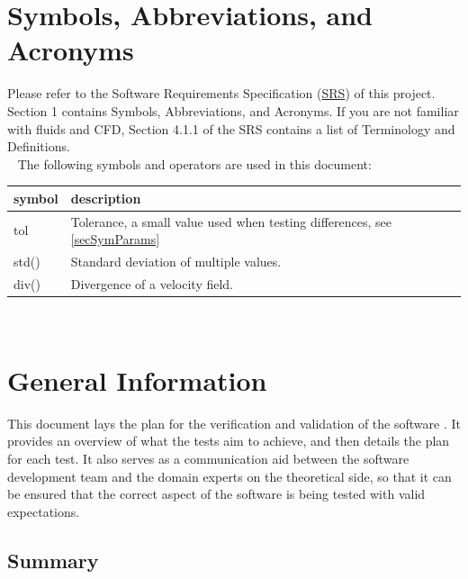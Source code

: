 \documentclass[12pt, titlepage]{article}
\begin{document}
\section{Symbols, Abbreviations, and Acronyms}

Please refer to the Software Requirements Specification (\href{https://github.com/omltcat/turbulent-flow/blob/main/docs/SRS/SRS.pdf}{SRS}) of this project. Section 1 contains Symbols, Abbreviations, and Acronyms. If you are not familiar with fluids and CFD, Section 4.1.1 of the SRS contains a list of Terminology and Definitions.\\
~\newline
The following symbols and operators are used in this document:\\
\renewcommand{\arraystretch}{1.2}
\begin{tabular}{l l} 
  \toprule		
  \textbf{symbol} & \textbf{description}\\
  \midrule 
  tol & Tolerance, a small value used when testing differences, see \ref{secSymParams}\\
  std() & Standard deviation of multiple values.\\
  div() & Divergence of a velocity field.\\
  \bottomrule
\end{tabular}\\



\newpage


\section{General Information}

This document lays the plan for the verification and validation of the software \progname{}. It provides an overview of what the tests aim to achieve, and then details the plan for each test. It also serves as a communication aid between the software development team and the domain experts on the theoretical side, so that it can be ensured that the correct aspect of the software is being tested with valid expectations.

\subsection{Summary}
\end{document}
